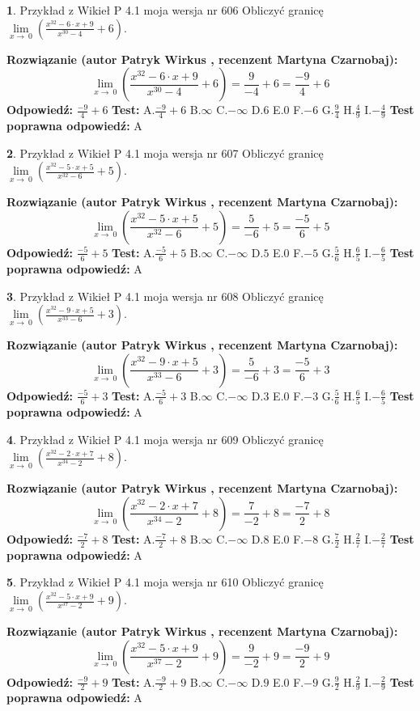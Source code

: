 \documentclass[12pt, a4paper]{article}
\theoremstyle{definition} %
\newtheorem{zad}{}
\newcommand{\zadStart}[1]{\begin{zad}#1\newline}
\newcommand{\zadStop}{\end{zad}}
\newcommand{\rozwStart}[2]{\noindent \textbf{Rozwiązanie (autor #1 , recenzent #2): }\newline}
\newcommand{\rozwStop}{\newline}
\newcommand{\odpStart}{\noindent \textbf{Odpowiedź:}\newline}
\newcommand{\odpStop}{\newline}
\newcommand{\testStart}{\noindent \textbf{Test:}\newline}
\newcommand{\testStop}{\newline}
\newcommand{\kluczStart}{\noindent \textbf{Test poprawna odpowiedź:}\newline}
\newcommand{\kluczStop}{\newline}
\begin{document}
\zadStart{Przykład z Wikieł P 4.1 moja wersja nr 606}
Obliczyć granicę $\lim\limits_{x\to\ 0}(\frac{x^{32}-6 \cdot x +9}{x^{30}-4}+6)$.
\zadStop
\rozwStart{Patryk Wirkus}{Martyna Czarnobaj}
$$\lim\limits_{x\to\ 0}(\frac{x^{32}-6 \cdot x +9}{x^{30}-4}+6)=\frac{9}{-4}+6=\frac{-9}{4}+6$$
\rozwStop
\odpStart
$\frac{-9}{4}+6$
\odpStop
\testStart
A.$\frac{-9}{4}+6$
B.$\infty$
C.$-\infty$
D.$6$
E.$0$
F.$-6$
G.$\frac{9}{4}$
H.$\frac{4}{9}$
I.$-\frac{4}{9}$
\testStop
\kluczStart
A
\kluczStop



\zadStart{Przykład z Wikieł P 4.1 moja wersja nr 607}
Obliczyć granicę $\lim\limits_{x\to\ 0}(\frac{x^{32}-5 \cdot x +5}{x^{32}-6}+5)$.
\zadStop
\rozwStart{Patryk Wirkus}{Martyna Czarnobaj}
$$\lim\limits_{x\to\ 0}(\frac{x^{32}-5 \cdot x +5}{x^{32}-6}+5)=\frac{5}{-6}+5=\frac{-5}{6}+5$$
\rozwStop
\odpStart
$\frac{-5}{6}+5$
\odpStop
\testStart
A.$\frac{-5}{6}+5$
B.$\infty$
C.$-\infty$
D.$5$
E.$0$
F.$-5$
G.$\frac{5}{6}$
H.$\frac{6}{5}$
I.$-\frac{6}{5}$
\testStop
\kluczStart
A
\kluczStop



\zadStart{Przykład z Wikieł P 4.1 moja wersja nr 608}
Obliczyć granicę $\lim\limits_{x\to\ 0}(\frac{x^{32}-9 \cdot x +5}{x^{33}-6}+3)$.
\zadStop
\rozwStart{Patryk Wirkus}{Martyna Czarnobaj}
$$\lim\limits_{x\to\ 0}(\frac{x^{32}-9 \cdot x +5}{x^{33}-6}+3)=\frac{5}{-6}+3=\frac{-5}{6}+3$$
\rozwStop
\odpStart
$\frac{-5}{6}+3$
\odpStop
\testStart
A.$\frac{-5}{6}+3$
B.$\infty$
C.$-\infty$
D.$3$
E.$0$
F.$-3$
G.$\frac{5}{6}$
H.$\frac{6}{5}$
I.$-\frac{6}{5}$
\testStop
\kluczStart
A
\kluczStop



\zadStart{Przykład z Wikieł P 4.1 moja wersja nr 609}
Obliczyć granicę $\lim\limits_{x\to\ 0}(\frac{x^{32}-2 \cdot x +7}{x^{34}-2}+8)$.
\zadStop
\rozwStart{Patryk Wirkus}{Martyna Czarnobaj}
$$\lim\limits_{x\to\ 0}(\frac{x^{32}-2 \cdot x +7}{x^{34}-2}+8)=\frac{7}{-2}+8=\frac{-7}{2}+8$$
\rozwStop
\odpStart
$\frac{-7}{2}+8$
\odpStop
\testStart
A.$\frac{-7}{2}+8$
B.$\infty$
C.$-\infty$
D.$8$
E.$0$
F.$-8$
G.$\frac{7}{2}$
H.$\frac{2}{7}$
I.$-\frac{2}{7}$
\testStop
\kluczStart
A
\kluczStop



\zadStart{Przykład z Wikieł P 4.1 moja wersja nr 610}
Obliczyć granicę $\lim\limits_{x\to\ 0}(\frac{x^{32}-5 \cdot x +9}{x^{37}-2}+9)$.
\zadStop
\rozwStart{Patryk Wirkus}{Martyna Czarnobaj}
$$\lim\limits_{x\to\ 0}(\frac{x^{32}-5 \cdot x +9}{x^{37}-2}+9)=\frac{9}{-2}+9=\frac{-9}{2}+9$$
\rozwStop
\odpStart
$\frac{-9}{2}+9$
\odpStop
\testStart
A.$\frac{-9}{2}+9$
B.$\infty$
C.$-\infty$
D.$9$
E.$0$
F.$-9$
G.$\frac{9}{2}$
H.$\frac{2}{9}$
I.$-\frac{2}{9}$
\testStop
\kluczStart
A
\kluczStop
\end{document}
